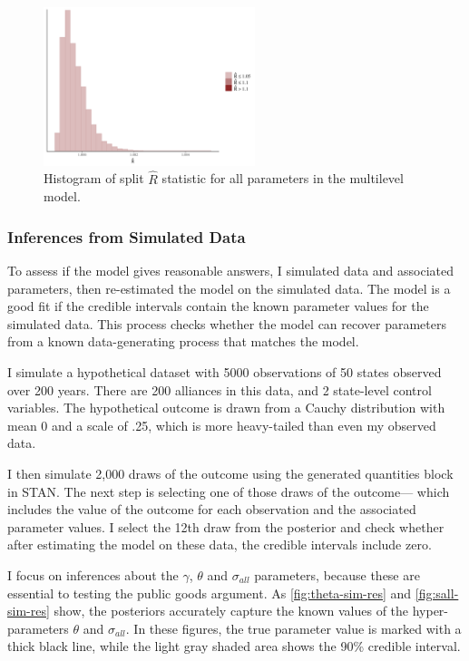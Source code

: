\documentclass[12pt]{article}
\begin{document}
\begin{figure}[htbp]
	\centering
		\includegraphics[width=0.55\textwidth]{rhat-plot.pdf}
	\caption{Histogram of split $\hat{R}$ statistic for all parameters in the multilevel model.}
	\label{fig:rhat-plot}
\end{figure}


\subsubsection{Inferences from Simulated Data}


To assess if the model gives reasonable answers, I simulated data and associated parameters, then re-estimated the model on the simulated data.
The model is a good fit if the credible intervals contain the known parameter values for the simulated data. 
This process checks whether the model can recover parameters from a known data-generating process that matches the model. 


I simulate a hypothetical dataset with 5000 observations of 50 states observed over 200 years. 
There are 200 alliances in this data, and 2 state-level control variables. 
The hypothetical outcome is drawn from a Cauchy distribution with mean 0 and a scale of .25, which is more heavy-tailed than even my observed data. 


I then simulate 2,000 draws of the outcome using the generated quantities block in STAN. 
The next step is selecting one of those draws of the outcome--- which includes the value of the outcome for each observation and the associated parameter values. 
I select the 12th draw from the posterior and check whether after estimating the model on these data, the credible intervals include zero. 


I focus on inferences about the $\gamma$, $\theta$ and $\sigma_{all}$ parameters, because these are essential to testing the public goods argument. 
As \autoref{fig:theta-sim-res} and \autoref{fig:sall-sim-res} show, the posteriors accurately capture the known values of the hyper-parameters $\theta$ and $\sigma_{all}$. 
In these figures, the true parameter value is marked with a thick black line, while the light gray shaded area shows the 90\% credible interval. 
\end{document}
